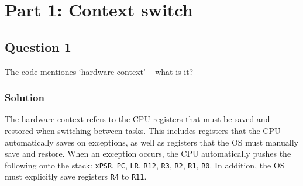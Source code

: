 \section*{Part 1: Context switch}

\subsection*{Question 1}

The code mentiones `hardware context' – what is it?

\subsubsection*{Solution}

The hardware context refers to the CPU registers that must be saved and restored when switching between tasks.
This includes registers that the CPU automatically saves on exceptions, as well as registers that the OS must manually save and restore.
When an exception occurs, the CPU automatically pushes the following onto the stack: \texttt{xPSR}, \texttt{PC}, \texttt{LR}, \texttt{R12}, \texttt{R3}, \texttt{R2}, \texttt{R1}, \texttt{R0}.
In addition, the OS must explicitly save registers \texttt{R4} to \texttt{R11}.
